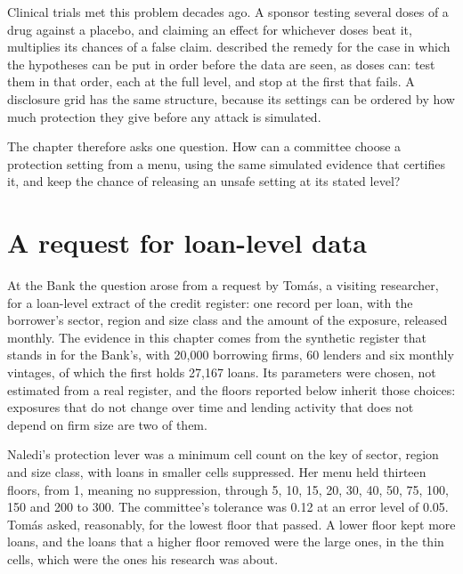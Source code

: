 Clinical trials met this problem decades ago. A sponsor testing several doses of a drug
against a placebo, and claiming an effect for whichever doses beat it, multiplies its
chances of a false claim. \citet{maurer1995} described the remedy for the case in which
the hypotheses can be put in order before the data are seen, as doses can: test them in
that order, each at the full level, and stop at the first that fails. A disclosure grid
has the same structure, because its settings can be ordered by how much protection they
give before any attack is simulated.

The chapter therefore asks one question. How can a committee choose a protection setting
from a menu, using the same simulated evidence that certifies it, and keep the chance of
releasing an unsafe setting at its stated level?

\section{A request for loan-level data}

At the Bank the question arose from a request by Tomás, a visiting researcher, for a
loan-level extract of the credit register: one record per loan, with the borrower's
sector, region and size class and the amount of the exposure, released monthly. The
evidence in this chapter comes from the synthetic register that stands in for the Bank's,
with 20,000 borrowing firms, 60 lenders and six monthly vintages, of which the first
holds 27,167 loans.
Its parameters were chosen, not estimated from a real register, and the floors reported
below inherit those choices: exposures that do not change over time and lending activity
that does not depend on firm size are two of them.

Naledi's protection lever was a minimum cell count on the key of sector, region and size
class, with loans in smaller cells suppressed. Her menu held thirteen floors, from 1,
meaning no suppression, through 5, 10, 15, 20, 30, 40, 50, 75, 100, 150 and 200 to 300.
The committee's tolerance was 0.12 at an error level of 0.05.
Tomás asked, reasonably, for the lowest floor that passed. A lower floor kept more loans,
and the loans that a higher floor removed were the large ones, in the thin cells, which
were the ones his research was about.

